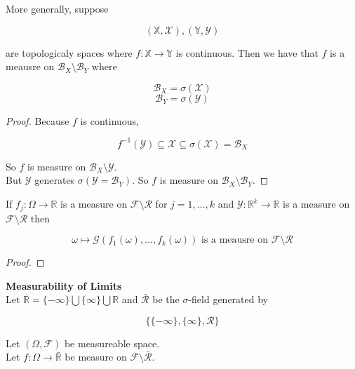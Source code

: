 \documentclass[11pt,fleqn]{book} %
\begin{document}
More generally, suppose 
		
		$$(\mathbb{X}, \mathcal{X}), (\mathbb{Y}, \mathcal{Y}) $$

are topologicaly spaces where $f: \mathbb{X} \rightarrow \mathbb{Y}$ is continuous. Then we have that $f$ is a meausre on $\mathcal{B}_X\setminus \mathcal{B}_Y$ where

		$$\mathcal{B}_X = \sigma(\mathcal{X}) $$
		$$ \mathcal{B}_Y = \sigma(\mathcal{Y}) $$


\begin{proof}
	Because $f$ is continuous, 

			$$f^{-1}(\mathcal{Y}) \subseteq \mathcal{X} \subseteq \sigma(\mathcal{X}) = \mathcal{B}_X $$

		So $f$ is measure on $\mathcal{B}_X\setminus \mathcal{Y}$.\\

		But $\mathcal{Y}$ generates $\sigma(\mathcal{Y} = \mathcal{B}_Y)$. So $f$ is measure on $\mathcal{B}_X\setminus \mathcal{B}_Y$.
\end{proof}


\begin{theorem}
	If $f_j: \Omega \rightarrow\mathbb{R}$ is a measure on $\mathcal{F}\setminus \mathcal{R}$ for $j = 1, \dots, k$ and $\mathcal{Y}: \mathbb{R}^k \rightarrow\mathbb{R}$ is a measure on $\mathcal{F}\setminus \mathcal{R}$ then

			$$\omega \mapsto \mathcal{G}(f_1(\omega), \dots, f_k(\omega)) \text{ is a meausre on }\mathcal{F}\setminus \mathcal{R}$$

\end{theorem}


\begin{proof}
	
\end{proof}


\textbf{Measurability of Limits}\\

Let $\bar{\mathbb{R}} = \{-\infty\} \bigcup \{\infty\} \bigcup \mathbb{R}$ and $\bar{\mathcal{R}} $ be the $\sigma$-field generated by

		$$\{\{-\infty\}, \{\infty\}, \mathcal{R}  \} $$

Let $(\Omega, \mathcal{F})$ be measureable space. \\

Let $f: \Omega \rightarrow \bar{\mathbb{R}}$ be measure on $\mathcal{F}\setminus \bar{\mathcal{R}}$. \\
\end{document}
